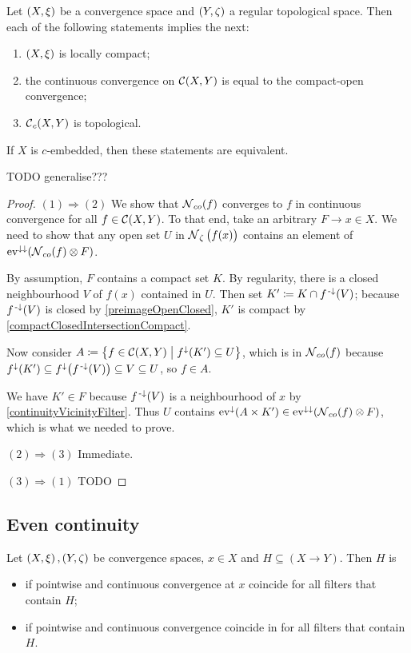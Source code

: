 \begin{proposition} \label{continuousConvergenceCompactOpen}
Let $\left( X,\xi \right)$ be a convergence space and $\left( Y,\zeta \right)$ a regular topological space. Then each of the following statements implies the next:
\begin{enumerate}
\item $\left( X,\xi \right)$ is locally compact;
\item the continuous convergence on $\operatorname{\mathcal{C}}(X,Y)$ is equal to the compact-open convergence;
\item $\operatorname{\mathcal{C}}_c(X,Y)$ is topological.
\end{enumerate}
If $X$ is $c$-embedded, then these statements are equivalent.
\end{proposition}
TODO generalise???
\begin{proof}
$(1) \Rightarrow (2)$ We show that $\operatorname{\mathcal{N}}_{co}(f)$ converges to $f$ in continuous convergence for all $f\in \operatorname{\mathcal{C}}(X,Y)$. To that end, take an arbitrary $F\to x\in X$. We need to show that any open set $U$ in $\operatorname{\mathcal{N}}_\zeta\big(f(x)\big)$ contains an element of $\operatorname{ev}^{\downarrow\downarrow}(\operatorname{\mathcal{N}}_{co}(f)\otimes F)$.

By assumption, $F$ contains a compact set $K$. By regularity, there is a closed neighbourhood $V$ of $f(x)$ contained in $U$. Then set $K' \coloneqq K \cap f^{{\text{\hspace{0.15em}-}\downarrow}}(V)$; because $f^{{\text{\hspace{0.15em}-}\downarrow}}(V)$ is closed by \ref{preimageOpenClosed}, $K'$ is compact by \ref{compactClosedIntersectionCompact}.

Now consider $A \defeq \setbuilder{f\in \cont(X,Y)}{f^\imf(K')\subseteq U}$, which is in $\operatorname{\mathcal{N}}_{co}(f)$ because $f^\downarrow(K')\subseteq f^{\downarrow}\big(f^{{\text{\hspace{0.15em}-}\downarrow}}(V)\big) \subseteq V \subseteq U$, so $f\in A$.

We have $K'\in F$ because $f^{{\text{\hspace{0.15em}-}\downarrow}}(V)$ is a neighbourhood of $x$ by \ref{continuityVicinityFilter}. Thus $U$ contains $\operatorname{ev}^\downarrow(A\times K') \in \operatorname{ev}^{\downarrow\downarrow}(\operatorname{\mathcal{N}}_{co}(f)\otimes F)$, which is what we needed to prove.

$(2) \Rightarrow (3)$ Immediate.

$(3) \Rightarrow (1)$ TODO
\end{proof}

\subsection{Even continuity}
\begin{definition}
Let $\left( X,\xi \right),\left( Y, \zeta \right)$ be convergence spaces, $x\in X$ and $H\subseteq (X\to Y)$. Then $H$ is
\begin{itemize}
\item {} if pointwise and continuous convergence at $x$ coincide for all filters that contain $H$;
\item {} if pointwise and continuous convergence coincide in for all filters that contain $H$.
\end{itemize}
\end{definition}


